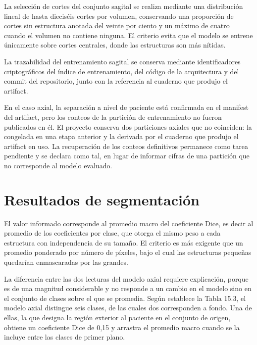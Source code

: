 
La selección de cortes del conjunto sagital se realiza mediante una distribución lineal de hasta dieciséis cortes por volumen, conservando una proporción de cortes sin estructura anotada del veinte por ciento y un máximo de cuatro cuando el volumen no contiene ninguna. El criterio evita que el modelo se entrene únicamente sobre cortes centrales, donde las estructuras son más nítidas.

La trazabilidad del entrenamiento sagital se conserva mediante identificadores criptográficos del índice de entrenamiento, del código de la arquitectura y del commit del repositorio, junto con la referencia al cuaderno que produjo el artifact.

En el caso axial, la separación a nivel de paciente está confirmada en el manifest del artifact, pero los conteos de la partición de entrenamiento no fueron publicados en él. El proyecto conserva dos particiones axiales que no coinciden: la congelada en una etapa anterior y la derivada por el cuaderno que produjo el artifact en uso. La recuperación de los conteos definitivos permanece como tarea pendiente y se declara como tal, en lugar de informar cifras de una partición que no corresponde al modelo evaluado.

\section{Resultados de segmentación}


El valor informado corresponde al promedio macro del coeficiente Dice, es decir al promedio de los coeficientes por clase, que otorga el mismo peso a cada estructura con independencia de su tamaño. El criterio es más exigente que un promedio ponderado por número de píxeles, bajo el cual las estructuras pequeñas quedarían enmascaradas por las grandes.

La diferencia entre las dos lecturas del modelo axial requiere explicación, porque es de una magnitud considerable y no responde a un cambio en el modelo sino en el conjunto de clases sobre el que se promedia. Según establece la Tabla 15.3, el modelo axial distingue seis clases, de las cuales dos corresponden a fondo. Una de ellas, la que designa la región exterior al paciente en el conjunto de origen, obtiene un coeficiente Dice de 0,15 y arrastra el promedio macro cuando se la incluye entre las clases de primer plano.

